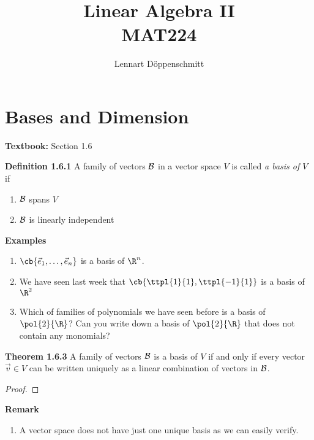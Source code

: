 \documentclass[letterpaper, 10pt]{article}
\begin{document}

\title{Linear Algebra II \\ \Large{MAT224}}
\author{Lennart Döppenschmitt}

\section*{Bases and Dimension}%
\label{sec:title}

\textbf{Textbook:} Section 1.6


\lb
\textbf{Definition 1.6.1}
\lb
A family of vectors $\cal B$ in a vector space $V$ is called \emph{a basis of $V$} if
\begin{enumerate}
    \item $\cal B$ spans $V$
    \item $\cal B$ is linearly independent
\end{enumerate}



\lb
\textbf{Examples} 
\begin{enumerate}
    \item $ \cb{\vec e_1, \ldots, \vec e_n} $ is a basis of $\R^n$.
    \item We have seen last week that $ \cb{\ttpl{1}{1}, \ttpl{-1}{1}} $ is a basis of $\R^2$
    \item Which of families of polynomials we have seen before is a basis of $\pol{2}{\R}$?
        Can you write down a basis of $\pol{2}{\R}$ that does not contain any monomials?
\end{enumerate}



\lb
\textbf{Theorem 1.6.3}
\lb
A family of vectors $\cal B$ is a basis of $V$ if and only if every vector
$\vec v ∈ V$ can be written uniquely as a linear combination of vectors in
$\cal B$.

\begin{proof}
\end{proof}



\lb
\textbf{Remark} 
\begin{enumerate}
    \item A vector space does not have just one unique
        basis as we can easily verify.
\end{enumerate}
\end{document}
